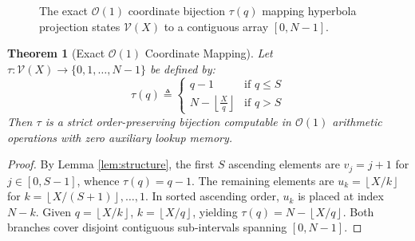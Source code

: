 \documentclass[11pt,a4paper]{article}
\theoremstyle{plain}
\newtheorem{theorem}{Theorem}[section]
\theoremstyle{definition}
\newcommand{\V}{\mathcal{V}}
\newcommand{\Oh}{\mathcal{O}}
\newcommand{\floor}[1]{\left\lfloor #1 \right\rfloor}
\begin{document}
\begin{figure}[htbp]
\centering
{}
\caption{The exact $\Oh(1)$ coordinate bijection $\tau(q)$ mapping hyperbola projection states $\V(X)$ to a contiguous array $[0, N-1]$.}
\label{fig:bijection}
\end{figure}

\begin{theorem}[Exact $\Oh(1)$ Coordinate Mapping]
\label{thm:coordinate}
Let $\tau: \V(X) \to \{0, 1, \dots, N-1\}$ be defined by:
\begin{equation}
    \tau(q) \triangleq \begin{cases} 
    q - 1 & \text{if } q \le S \\ 
    N - \floor{\frac{X}{q}} & \text{if } q > S 
    \end{cases}
\end{equation}
Then $\tau$ is a strict order-preserving bijection computable in $\Oh(1)$ arithmetic operations with zero auxiliary lookup memory.
\end{theorem}

\begin{proof}
By Lemma \ref{lem:structure}, the first $S$ ascending elements are $v_j = j + 1$ for $j \in [0, S-1]$, whence $\tau(q) = q - 1$. The remaining elements are $u_k = \floor{X/k}$ for $k = \floor{X/(S+1)}, \dots, 1$. In sorted ascending order, $u_k$ is placed at index $N - k$. Given $q = \floor{X/k}$, $k = \floor{X/q}$, yielding $\tau(q) = N - \floor{X/q}$. Both branches cover disjoint contiguous sub-intervals spanning $[0, N-1]$.
\end{proof}
\end{document}
